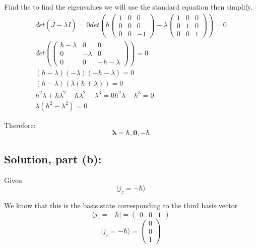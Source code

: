 \documentclass[12pt]{article}
\begin{document}
        Find the to find the eigenvalues we will use the standard equation then simplify.
        \begin{align*}
            det(\hat{J} - \lambda I) = 0 
            det\left( \hbar \begin{pmatrix} 
                        1 & 0 & 0 \\ 
                        0 & 0 & 0 \\ 
                        0 & 0 & -1 
                    \end{pmatrix} - \lambda \begin{pmatrix} 
                                                1 & 0 & 0 \\ 
                                                0 & 1 & 0 \\ 
                                                0 & 0 & 1 
                                            \end{pmatrix} \right) = 0\\
            det\left(\begin{pmatrix} 
                \hbar - \lambda & 0         & 0 \\ 
                0               & -\lambda  & 0 \\ 
                0               & 0         & -\hbar - \lambda
            \end{pmatrix} \right) = 0\\
            (\hbar - \lambda) (-\lambda) (-\hbar - \lambda) = 0 \\
            (\hbar - \lambda) (\lambda (\hbar + \lambda)) = 0 \\
            \hbar^2 \lambda + \hbar \lambda^2 - \hbar \lambda^2 - \lambda^3 = 0
            \hbar^2 \lambda - \hbar^3 = 0 \\
            \lambda (\hbar^2 - \lambda^2) = 0
        \end{align*}

        Therefore:
        \[
            \boldsymbol{\boxed{\lambda = \hbar, 0, -\hbar}}
        \]

    \subsection{Solution, part (b):}
        Given 
        \[
            |j_z = -\hbar \rangle
        \]

        We know that this is the basis state corresponding to the third basis vector
        \begin{equation} \label{eq <jh|}
            \langle j_z = -\hbar | = \begin{pmatrix}
                0 & 0 & 1
            \end{pmatrix}
        \end{equation}
        \begin{equation} \label{eq |jh>}
            |j_z = -\hbar\rangle = \begin{pmatrix}
                0 \\ 0 \\ 1
            \end{pmatrix}
        \end{equation}
\end{document}
